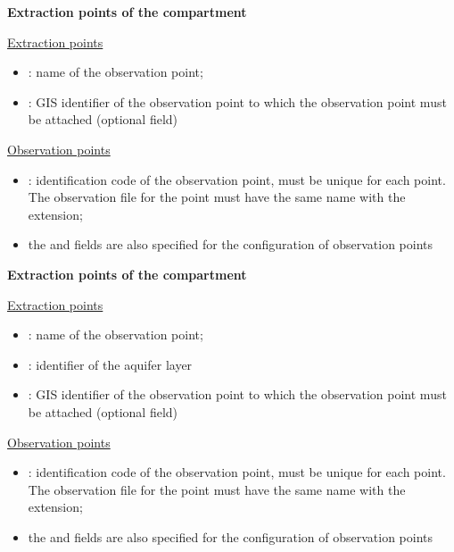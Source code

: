 \begin{minipage}[t]{0.45\textwidth}
    \textbf{Extraction points of the  compartment} 
    \vspace{4pt}

     \underline{Extraction points}

    \begin{itemize}
        \item {}: name of the observation point;
        \item {}: GIS identifier of the observation point to which the observation point must be attached (optional field)
    \end{itemize}

    \vspace{2pt}
    \underline{Observation points} 
    \begin{itemize}
        \item {}: identification code of the observation point, must be unique for each point. The observation file for the point must have the same name with the  extension;
        \item the  and  fields are also specified for the configuration of observation points 
    \end{itemize}
    \vspace{8pt}
    \textbf{Extraction points of the  compartment} 
    \vspace{4pt}

     \underline{Extraction points}

    \begin{itemize}
        \item {}: name of the observation point;
        \item {}: identifier of the aquifer layer
        \item {}: GIS identifier of the observation point to which the observation point must be attached (optional field)
    \end{itemize}

    \vspace{2pt}
    \underline{Observation points} 
    \begin{itemize}
        \item {}: identification code of the observation point, must be unique for each point. The observation file for the point must have the same name with the  extension;
        \item the  and  fields are also specified for the configuration of observation points
    \end{itemize}

    
\end{minipage}%
